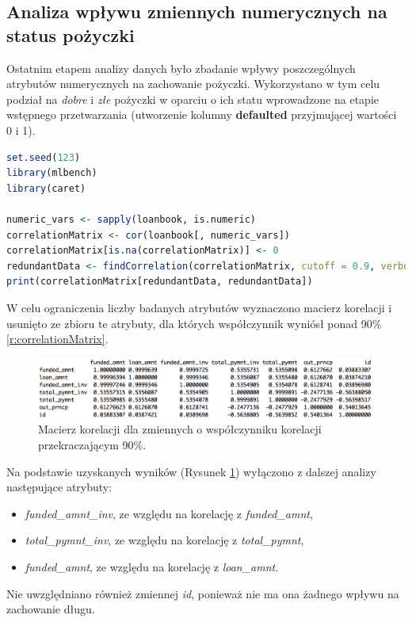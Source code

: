 \subsection{Analiza wpływu zmiennych numerycznych na status pożyczki}

Ostatnim etapem analizy danych było zbadanie wpływy poszczególnych atrybutów numerycznych na zachowanie pożyczki. Wykorzystano w tym celu podział na \textit{dobre} i \textit{złe} pożyczki w oparciu o ich statu wprowadzone na etapie wstępnego przetwarzania (utworzenie kolumny \textbf{defaulted} przyjmującej wartości 0 i 1). 

\begin{lstlisting}[language=R, caption={Skrypt wyznaczający macierz koralacji dla zmiennych numerycznych.}, label={r:correlationMatrix}]
set.seed(123)
library(mlbench)
library(caret)

numeric_vars <- sapply(loanbook, is.numeric)
correlationMatrix <- cor(loanbook[, numeric_vars])
correlationMatrix[is.na(correlationMatrix)] <- 0
redundantData <- findCorrelation(correlationMatrix, cutoff = 0.9, verbose = TRUE, names = TRUE, exact = TRUE)
print(correlationMatrix[redundantData, redundantData])
\end{lstlisting}

W celu ograniczenia liczby badanych atrybutów wyznaczono macierz korelacji i usunięto ze zbioru te atrybuty, dla których współczynnik wyniósł ponad 90\% \ref{r:correlationMatrix}.

\begin{figure}[h] \centering %
	\includegraphics[scale=0.6]{img/redundantData.png}
	\caption{Macierz korelacji dla zmiennych o współczynniku korelacji przekraczającym 90\%.}
	\label{lc:redundantData}
\end{figure}

Na podstawie uzyskanych wyników (Rysunek \ref{lc:redundantData}) wyłączono z dalszej analizy następujące atrybuty:

\begin{itemize}
	\item \textit{funded\_amnt\_inv}, ze względu na korelację z \textit{funded\_amnt},
	\item \textit{total\_pymnt\_inv}, ze względu na korelację z \textit{total\_pymnt},
	\item \textit{funded\_amnt}, ze względu na korelację z \textit{loan\_amnt}.
\end{itemize}
Nie uwzględniano również zmiennej \textit{id}, ponieważ nie ma ona żadnego wpływu na zachowanie długu.

